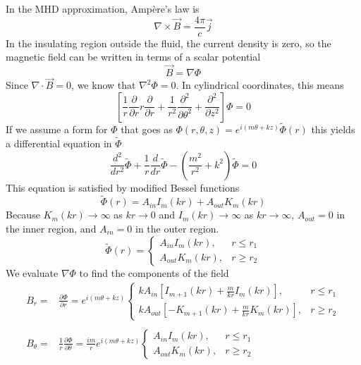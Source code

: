 \documentclass[letterpaper]{article}
\begin{document}
In the MHD approximation, Amp\`{e}re's law is
\begin{equation}
\nabla \times \vec{B} = \frac{4\pi}{c}\vec{j}
\end{equation}
In the insulating region outside the fluid, the current density is
zero, so the magnetic field can be written in terms of a scalar
potential
\begin{equation}
\vec{B} = \nabla\Phi
\end{equation}
Since $\nabla\cdot\vec{B} = 0$, we know that $\nabla^2 \Phi = 0$.  In
cylindrical coordinates, this means
\begin{equation}
\left[\frac{1}{r}\frac{\partial}{\partial r}r\frac{\partial}{\partial r} 
 + \frac{1}{r^2}\frac{\partial^2}{\partial\theta^2}
 + \frac{\partial^2}{\partial z^2}\right]\Phi = 0
\end{equation}
If we assume a form for $\Phi$ that goes as $\Phi(r,\theta,z) =
e^{i(m\theta + k z)}\tilde{\Phi}(r)$ this yields a differential
equation in $\tilde{\Phi}$
\begin{equation}
\frac{d^2}{d r^2}\tilde{\Phi} + \frac{1}{r}\frac{d}{dr}\tilde{\Phi} 
 - \left(\frac{m^2}{r^2} + k^2\right)\tilde{\Phi} = 0
\end{equation}
This equation is satisfied by modified Bessel functions
\begin{equation}
\tilde{\Phi}(r) = A_{in} I_m (k r) + A_{out} K_m (k r)
\end{equation}
Because $K_m(kr)\rightarrow \infty$ as $k r \rightarrow 0$ and
$I_m(kr) \rightarrow \infty$ as $k r \rightarrow \infty$, $A_{out} =
0$ in the inner region, and $A_{in} = 0$ in the outer region.
\begin{equation}
\tilde{\Phi}(r) = \begin{cases}
                     A_{in} I_m(k r), &r \le r_1 \\
                     A_{out} K_m(k r), &r \ge r_2
                  \end{cases}
\end{equation}
We evaluate $\nabla \Phi$ to find the components of the field
\begin{align}
B_r = &\frac{\partial \Phi}{\partial r} = e^{i(m\theta + kz)}
 \begin{cases}
   kA_{in}\left[I_{m+1}(kr) + \frac{m}{kr}I_{m}(kr)\right], &r \le r_1 \\
   kA_{out}\left[-K_{m+1}(kr) + \frac{m}{kr}K_{m}(kr)\right], &r \ge r_2
 \end{cases}
\\
\nonumber \\
B_\theta = &\frac{1}{r}\frac{\partial \Phi}{\partial \theta} 
         = \frac{im}{r}e^{i(m\theta + kz)}
           \begin{cases}
             A_{in} I_m(k r), &r \le r_1 \\
             A_{out} K_m(k r), &r \ge r_2
           \end{cases}
\end{align}
\end{document}
